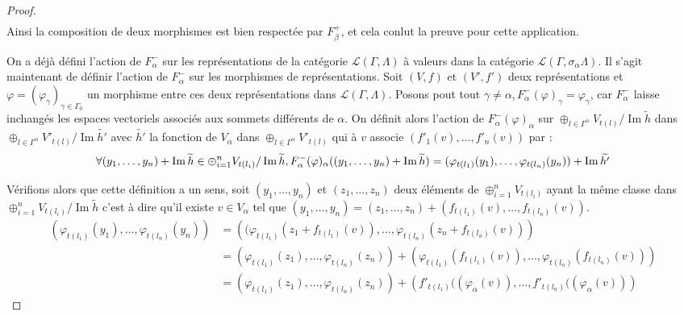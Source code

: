 \documentclass[a4paper,11pt]{article}
\DeclareMathOperator{\Img}{Im}
\begin{document}
\begin{proof}
\[\begin{array}{ll}
	\end{array}
\]
Ainsi la composition de deux morphismes est bien respectée par $F_{\beta}^{+}$, et cela conlut la preuve pour cette application.

On a déjà défini l'action de $F_{\alpha}^{-}$ sur les représentations de la catégorie $\mathscr L(\Gamma,\Lambda)$ à valeurs dans la catégorie $\mathscr L(\Gamma,\sigma_{\alpha}\Lambda)$. Il s'agit maintenant de définir l'action de $F_{\alpha}^{-}$ sur les morphismes de représentations. Soit $(V,f)$ et $(V',f')$ deux représentations et $\varphi = (\varphi_{\gamma})_{\gamma \in \Gamma_{0}}$ un morphisme entre ces deux représentations dans $\mathscr L(\Gamma,\Lambda)$. Posons pout tout $\gamma \neq \alpha, F_{\alpha}^{-}(\varphi)_{\gamma} = \varphi_{\gamma}$, car $F_{\alpha}^{-}$ laisse inchangés les espaces vectoriels associés aux sommets différents de $\alpha$. On définit alors l'action de  $F^{-}_{\alpha}(\varphi)_{\alpha}$ sur $\oplus_{l \in \Gamma^{\alpha}} V_{t(l)} / \Img \widetilde{h}$  dans $\oplus_{l \in \Gamma^{\alpha}} V'_{t(l)} / \Img \widetilde{h'}$ avec $\widetilde{h'}$ la fonction de $V_{\alpha}$ dans  $\oplus_{l \in \Gamma^{\alpha}} V'_{t(l)}$ qui à $v$ associe $(f'_{1}(v), \dots , f'_{n}(v))$ par : 
\[
\forall(y_{1}, \dots, y_{n})+ \Img \widetilde{h} \in  \oplus_{ i=1}^{n} V_{t(l_{i})} / \Img \widetilde{h}, \\ 
F_{\alpha}^{-}(\varphi)_{\alpha}((y_{1}, \dots, y_{n}) +\Img \widetilde{h}) = (\varphi_{t(l_{1})}(y_{1}), \dots , \varphi_{t(l_{n})}(y_{n})) + \Img \widetilde{h'}
\]

Vérifions alors que cette définition a un sens, soit $(y_{1}, \dots, y_{n})$ et $(z_{1}, \dots , z_{n})$ deux éléments de $\oplus_{i=1}^{n} V_{t(l_{i})}$ ayant la même classe dans $\oplus_{i=1}^{n} V_{t(l_{i})} / \Img \widetilde{h}$ c'est à dire qu'il existe $v \in V_{\alpha}$ tel que  $(y_{1}, \dots, y_{n}) = (z_{1}, \dots , z_{n}) + (f_{t(l_{1})}(v), \dots, f_{t(l_{n})}(v))$.
\[
\begin{array}{ll}
  \left(\varphi_{t(l_{1})}(y_{1}), \dots, \varphi_{t(l_{n})}(y_{n}) \right) &= \left((\varphi_{t(l_{1})}(z_{1} + f_{t(l_{1})}(v)), \dots, \varphi_{t(l_{n})}(z_{n} + f_{t(l_{n})}(v))\right) \\
  &= \left(\varphi_{t(l_{1})}(z_{1}), \dots, \varphi_{t(l_{n})}(z_{n})\right) + \left(\varphi_{t(l_{1})}(f_{t(l_{1})}(v)), \dots, \varphi_{t(l_{n})}(f_{t(l_{n})}(v)) \right)\\
&= \left(\varphi_{t(l_{1})}(z_{1}), \dots, \varphi_{t(l_{n})}(z_{n})\right) + \left(f'_{t(l_{1})}((\varphi_{\alpha}(v)), \dots, f'_{t(l_{n})}((\varphi_{\alpha}(v)) \right)
\end{array}
\]


\end{proof}
\end{document}
